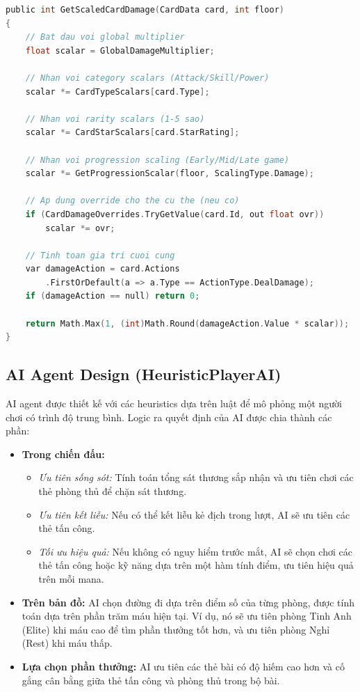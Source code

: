 \begin{lstlisting}[language=C, caption={Ví dụ cách HierarchicalGenome tính toán scaled damage cho thẻ bài}, label={lst:hierarchical_scaling}]
public int GetScaledCardDamage(CardData card, int floor)
{
    // Bat dau voi global multiplier
    float scalar = GlobalDamageMultiplier;
    
    // Nhan voi category scalars (Attack/Skill/Power)
    scalar *= CardTypeScalars[card.Type];
    
    // Nhan voi rarity scalars (1-5 sao)
    scalar *= CardStarScalars[card.StarRating];
    
    // Nhan voi progression scaling (Early/Mid/Late game)
    scalar *= GetProgressionScalar(floor, ScalingType.Damage);
    
    // Ap dung override cho the cu the (neu co)
    if (CardDamageOverrides.TryGetValue(card.Id, out float ovr))
        scalar *= ovr;
    
    // Tinh toan gia tri cuoi cung
    var damageAction = card.Actions
        .FirstOrDefault(a => a.Type == ActionType.DealDamage);
    if (damageAction == null) return 0;
    
    return Math.Max(1, (int)Math.Round(damageAction.Value * scalar));
}
\end{lstlisting}

\subsection{AI Agent Design (HeuristicPlayerAI)}
AI agent được thiết kế với các heuristics dựa trên luật để mô phỏng một người chơi có trình độ trung bình. Logic ra quyết định của AI được chia thành các phần:
\begin{itemize}
    \item \textbf{Trong chiến đấu:}
        \begin{itemize}
            \item \textit{Ưu tiên sống sót:} Tính toán tổng sát thương sắp nhận và ưu tiên chơi các thẻ phòng thủ để chặn sát thương.
            \item \textit{Ưu tiên kết liễu:} Nếu có thể kết liễu kẻ địch trong lượt, AI sẽ ưu tiên các thẻ tấn công.
            \item \textit{Tối ưu hiệu quả:} Nếu không có nguy hiểm trước mắt, AI sẽ chọn chơi các thẻ tấn công hoặc kỹ năng dựa trên một hàm tính điểm, ưu tiên hiệu quả trên mỗi mana.
        \end{itemize}
    \item \textbf{Trên bản đồ:} AI chọn đường đi dựa trên điểm số của từng phòng, được tính toán dựa trên phần trăm máu hiện tại. Ví dụ, nó sẽ ưu tiên phòng Tinh Anh (Elite) khi máu cao để tìm phần thưởng tốt hơn, và ưu tiên phòng Nghỉ (Rest) khi máu thấp.
    \item \textbf{Lựa chọn phần thưởng:} AI ưu tiên các thẻ bài có độ hiếm cao hơn và cố gắng cân bằng giữa thẻ tấn công và phòng thủ trong bộ bài.
\end{itemize}

